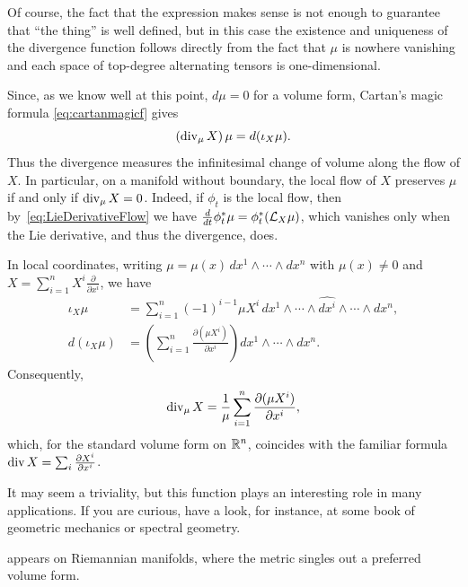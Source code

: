 Of course, the fact that the expression makes sense is not enough to guarantee that ``the thing'' is well defined, but in this case the existence and uniqueness of the divergence function follows directly from the fact that $\mu$ is nowhere vanishing and each space of top-degree alternating tensors is one-dimensional.

Since, as we know well at this point, $d\mu=0$ for a volume form, Cartan's magic formula \eqref{eq:cartanmagicf} gives
\begin{equation}\label{eq:divergence-exterior}
	(\operatorname{div}_\mu X)\,\mu = d(\iota_X\mu).
\end{equation}
Thus the divergence measures the infinitesimal change of volume along the flow of $X$.
In particular, on a manifold without boundary, the local flow of $X$ preserves $\mu$ if and only if $\operatorname{div}_\mu X=0$.
Indeed, if $\phi_t$ is the local flow, then by~\eqref{eq:LieDerivativeFlow} we have $\frac{d}{dt}\phi_t^*\mu=\phi_t^*(\mathcal{L}_X\mu)$, which vanishes only when the Lie derivative, and thus the divergence, does.

In local coordinates, writing $\mu=\mu(x)\,dx^1\wedge\cdots\wedge dx^n$ with $\mu(x)\neq 0$ and $X=\sum_{i=1}^n X^i\frac{\partial}{\partial x^i}$, we have
\begin{align}
	\iota_X\mu
	 & = \sum_{i=1}^n (-1)^{i-1}\mu X^i\,dx^1\wedge\cdots\wedge\widehat{dx^i}\wedge\cdots\wedge dx^n, \\
	d(\iota_X\mu)
	 & = \left(\sum_{i=1}^n\frac{\partial(\mu X^i)}{\partial x^i}\right)dx^1\wedge\cdots\wedge dx^n.
\end{align}
Consequently,
\begin{equation}
	\operatorname{div}_\mu X = \frac{1}{\mu}\sum_{i=1}^n\frac{\partial(\mu X^i)}{\partial x^i},
\end{equation}
which, for the standard volume form on $\mathbb{R}^n$, coincides with the familiar formula $\operatorname{div} X=\sum_i\frac{\partial X^i}{\partial x^i}$.

It may seem a triviality, but this function plays an interesting role in many applications. If you are curious, have a look, for instance, at some book of geometric mechanics or spectral geometry.

 appears on Riemannian manifolds, where the metric singles out a preferred volume form.

